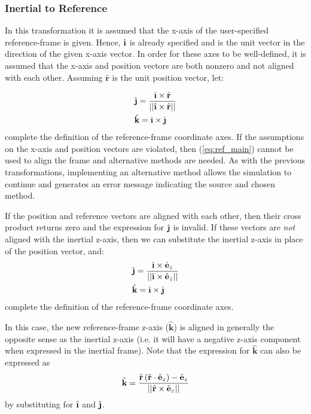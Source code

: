 \documentclass[11pt,fleqn]{report}
\begin{document}
\subsubsection{Inertial to Reference}
In this transformation it is assumed that the x-axis of the user-specified
reference-frame is given. Hence, $\hat{\textbf{\i}}$ is already specified and
is the unit vector in the direction of the given x-axis vector. In order for
these axes to be well-defined, it is assumed that the x-axis and position
vectors are both nonzero and not aligned with each other. Assuming
$\hat{\textbf{r}}$ is the unit position vector, let:

\begin{multline}
 \hat{\textbf{\j}} = \frac{\hat{\textbf{\i}} \times \hat{\textbf{r}}}
{||\hat{\textbf{\i}} \times \hat{\textbf{r}}||} \\
 \hat{\textbf{k}} = \hat{\textbf{\i}} \times \hat{\textbf{\j}} \hfill
 \label{eq:ref_main}
\end{multline}
complete the definition of the reference-frame coordinate axes.
If the assumptions on the x-axis and position vectors are violated,
then (\ref{eq:ref_main}) cannot be used to align the frame and
alternative methods are needed. As with the previous
transformations, implementing an alternative method allows the simulation to
continue and generates an error message indicating the source and chosen method.

If the position and reference vectors are aligned with each other, then
their cross product returns zero and the expression for $\hat{\textbf{\j}}$
is invalid. If these vectors are \textit{not} aligned with the inertial z-axis,
then we can substitute the inertial z-axis in place of the position vector,
and:
\begin{multline}
 \hat{\textbf{\j}} = \frac{\hat{\textbf{\i}} \times \hat{\textbf{e}}_z}
{||\hat{\textbf{\i}} \times \hat{\textbf{e}}_z||} \\
 \hat{\textbf{k}} = \hat{\textbf{\i}} \times \hat{\textbf{\j}} \hfill
 \label{eq:ref_noz}
\end{multline}
complete the definition of the reference-frame coordinate axes.

In this case, the new reference-frame z-axis ($\hat{\textbf{k}}$) is aligned in
generally the opposite sense as the inertial z-axis (i.e. it will have a
negative z-axis component when expressed in the inertial frame).
Note that the expression for $\hat{\textbf{k}}$ can also be expressed as
\begin{equation*}
 \hat{\textbf{k}} = \frac{ \hat{\textbf{r}}
 \left( \hat{\textbf{r}} \cdot
\hat{\textbf{e}}_z
 \right) -
 \hat{\textbf{e}}_z
}
{||\hat{\textbf{r}} \times \hat{\textbf{e}}_z||}
\hfill
\end{equation*}
by substituting for $\hat{\textbf{\i}}$ and $\hat{\textbf{\j}}$.
\end{document}
